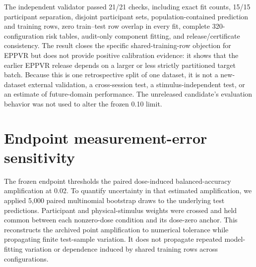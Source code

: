 \documentclass[preprint,12pt]{elsarticle}
\begin{document}
The independent validator passed 21/21 checks, including exact fit counts, 15/15 participant separation, disjoint participant sets, population-contained prediction and training rows, zero train--test row overlap in every fit, complete 320-configuration risk tables, audit-only component fitting, and release/certificate consistency. The result closes the specific shared-training-row objection for EPPVR but does not provide positive calibration evidence: it shows that the earlier EPPVR release depends on a larger or less strictly partitioned target batch. Because this is one retrospective split of one dataset, it is not a new-dataset external validation, a cross-session test, a stimulus-independent test, or an estimate of future-domain performance. The unreleased candidate's evaluation behavior was not used to alter the frozen 0.10 limit.

\section{Endpoint measurement-error sensitivity}

The frozen endpoint thresholds the paired dose-induced balanced-accuracy amplification at 0.02. To quantify uncertainty in that estimated amplification, we applied 5,000 paired multinomial bootstrap draws to the underlying test predictions. Participant and physical-stimulus weights were crossed and held common between each nonzero-dose condition and its dose-zero anchor. This reconstructs the archived point amplification to numerical tolerance while propagating finite test-sample variation. It does not propagate repeated model-fitting variation or dependence induced by shared training rows across configurations.

\begin{table}[!htbp]
\centering
\caption{Crossed test-sample uncertainty for the frozen source endpoint. CI crossing counts configurations whose 95\% bootstrap interval includes 0.02; LCB events require the lower bound to reach 0.02.}
\label{tab:endpoint-uncertainty-source}
\small
{}
\end{table}
\end{document}

